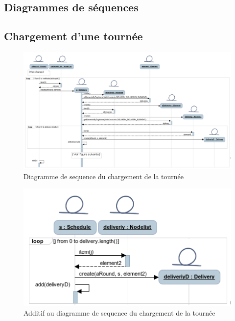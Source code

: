 \begin{landscape}
    \section{Diagrammes de s\'equences}

    \subsection{Chargement d'une tourn\'ee}

    \begin{figure}[h]
        \centering
        \includegraphics[width=0.8\linewidth]{../diagrams/sequences/loadRound1.png}
        \caption{Diagramme de sequence du chargement de la tourn\'ee}
        \label{diagram:seq_load_round}
    \end{figure}
\pagebreak

	\begin{figure}[h]
        \centering
        \includegraphics[width=0.6\linewidth]{../diagrams/sequences/loadRound2.png}
        \caption{Additif au diagramme de sequence du chargement de la tourn\'ee}
        \label{diagram:seq_load_round}
    \end{figure}
\end{landscape}
\pagebreak

